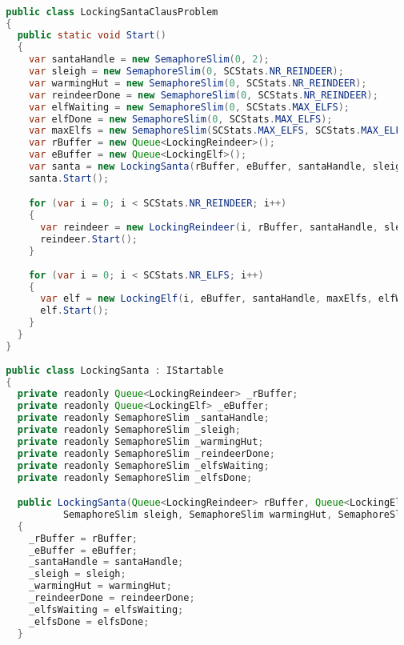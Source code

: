 \begin{lstlisting}[label=lst:impl_santa_lock,
  caption={Lock Based Santa Claus Implementation},
  language=Java,  
  showspaces=false,
  showtabs=false,
  breaklines=true,
  showstringspaces=false,
  breakatwhitespace=true,
  commentstyle=\color{greencomments},
  keywordstyle=\color{bluekeywords},
  stringstyle=\color{redstrings},
  escapechar=~,
  morekeywords={atomic, retry, orelse, var, get, set, ref, out, readonly, virtual, override, lock}]  % Start your code-block

  public class LockingSantaClausProblem
  {
    public static void Start()
    {
      var santaHandle = new SemaphoreSlim(0, 2); 
      var sleigh = new SemaphoreSlim(0, SCStats.NR_REINDEER);
      var warmingHut = new SemaphoreSlim(0, SCStats.NR_REINDEER);
      var reindeerDone = new SemaphoreSlim(0, SCStats.NR_REINDEER);
      var elfWaiting = new SemaphoreSlim(0, SCStats.MAX_ELFS);
      var elfDone = new SemaphoreSlim(0, SCStats.MAX_ELFS);
      var maxElfs = new SemaphoreSlim(SCStats.MAX_ELFS, SCStats.MAX_ELFS);
      var rBuffer = new Queue<LockingReindeer>();
      var eBuffer = new Queue<LockingElf>();
      var santa = new LockingSanta(rBuffer, eBuffer, santaHandle, sleigh, warmingHut, reindeerDone, elfWaiting, elfDone);
      santa.Start();

      for (var i = 0; i < SCStats.NR_REINDEER; i++)
      {
        var reindeer = new LockingReindeer(i, rBuffer, santaHandle, sleigh, warmingHut, reindeerDone);
        reindeer.Start();
      }
            
      for (var i = 0; i < SCStats.NR_ELFS; i++)
      {
        var elf = new LockingElf(i, eBuffer, santaHandle, maxElfs, elfWaiting, elfDone);
        elf.Start();
      }
    }
  }
  
  public class LockingSanta : IStartable
  {
    private readonly Queue<LockingReindeer> _rBuffer;
    private readonly Queue<LockingElf> _eBuffer;
    private readonly SemaphoreSlim _santaHandle;
    private readonly SemaphoreSlim _sleigh;
    private readonly SemaphoreSlim _warmingHut;
    private readonly SemaphoreSlim _reindeerDone;
    private readonly SemaphoreSlim _elfsWaiting;
    private readonly SemaphoreSlim _elfsDone;

    public LockingSanta(Queue<LockingReindeer> rBuffer, Queue<LockingElf> eBuffer, SemaphoreSlim santaHandle,
            SemaphoreSlim sleigh, SemaphoreSlim warmingHut, SemaphoreSlim reindeerDone, SemaphoreSlim elfsWaiting, SemaphoreSlim elfsDone)
    {
      _rBuffer = rBuffer;
      _eBuffer = eBuffer;
      _santaHandle = santaHandle;
      _sleigh = sleigh;
      _warmingHut = warmingHut;
      _reindeerDone = reindeerDone;
      _elfsWaiting = elfsWaiting;
      _elfsDone = elfsDone;
    }


\end{lstlisting}
